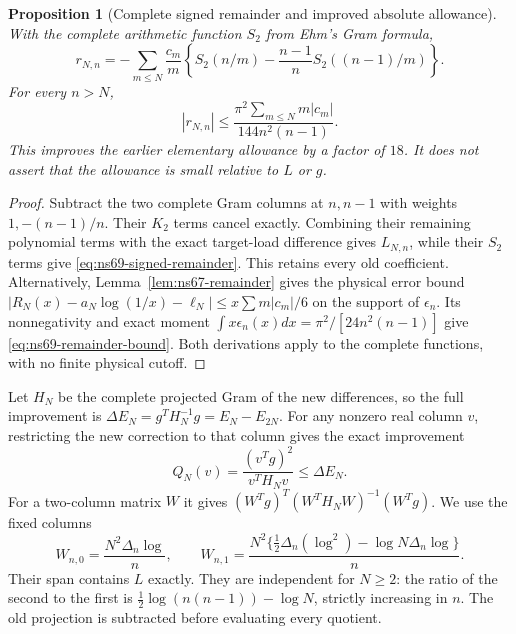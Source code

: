 \documentclass[11pt]{article}
\newtheorem{proposition}[theorem]{Proposition}
\theoremstyle{remark}
\begin{document}
\begin{proposition}[Complete signed remainder and improved absolute allowance]
\label{prop:ns69-remainder}
With the complete arithmetic function $S_2$ from Ehm's Gram formula,
\begin{equation}
 r_{N,n}=-\sum_{m\leq N}\frac{c_m}{m}
       \left\{S_2(n/m)-\frac{n-1}{n}S_2((n-1)/m)\right\}.
 \label{eq:ns69-signed-remainder}
\end{equation}
For every $n>N$,
\begin{equation}
 |r_{N,n}|\leq
 \frac{\pi^2\sum_{m\leq N}m|c_m|}{144n^2(n-1)}.
 \label{eq:ns69-remainder-bound}
\end{equation}
This improves the earlier elementary allowance by a factor of $18$.
It does not assert that the allowance is small relative to $L$ or $g$.
\end{proposition}
\begin{proof}
Subtract the two complete Gram columns at $n,n-1$ with weights
$1,-(n-1)/n$. Their $K_2$ terms cancel exactly. Combining their
remaining polynomial terms with the exact target-load difference
gives $L_{N,n}$, while their $S_2$ terms give
\eqref{eq:ns69-signed-remainder}. This retains every old coefficient.
Alternatively, Lemma~\ref{lem:ns67-remainder} gives the physical
error bound
$|R_N(x)-a_N\log(1/x)-\ell_N|\leq x\sum m|c_m|/6$
on the support of $\epsilon_n$. Its nonnegativity and exact moment
$\int x\epsilon_n(x)dx=\pi^2/[24n^2(n-1)]$ give
\eqref{eq:ns69-remainder-bound}. Both derivations apply to the
complete functions, with no finite physical cutoff.
\end{proof}

Let $H_N$ be the complete projected Gram of the new differences, so
the full improvement is $\Delta E_N=g^T H_N^{-1}g=E_N-E_{2N}$.
For any nonzero real column $v$, restricting the new correction to
that column gives the exact improvement
\begin{equation}
 Q_N(v)=\frac{(v^Tg)^2}{v^TH_Nv}\leq\Delta E_N.
 \label{eq:ns69-selected-gain}
\end{equation}
For a two-column matrix $W$ it gives
$(W^Tg)^T(W^TH_NW)^{-1}(W^Tg)$. We use the fixed columns
\[
 W_{n,0}=\frac{N^2\Delta_n\log}{n},\qquad
 W_{n,1}=\frac{N^2\{\tfrac12\Delta_n(\log^2)
                                      -\log N\Delta_n\log\}}{n}.
\]
Their span contains $L$ exactly. They are independent for $N\geq2$:
the ratio of the second to the first is
$\tfrac12\log(n(n-1))-\log N$, strictly increasing in $n$.
The old projection is subtracted before evaluating every quotient.
\end{document}
